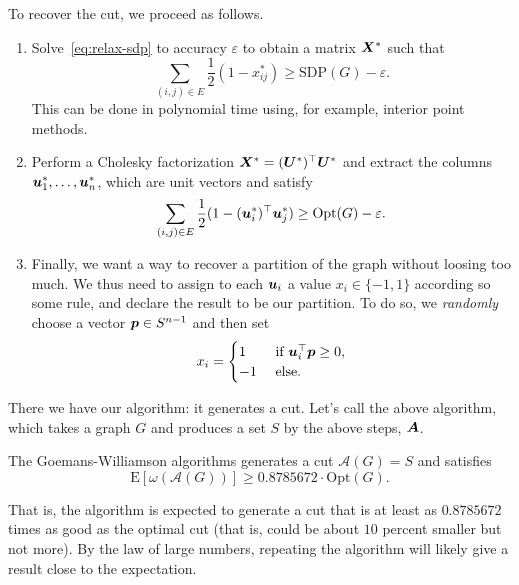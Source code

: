 To recover the cut, we proceed as follows.
\begin{enumerate}
 \item Solve~\eqref{eq:relax-sdp} to accuracy $\varepsilon$ to obtain a matrix $\bm{X}^*$ such that
 \begin{equation*}
  \sum_{(i,j)\in E} \frac{1}{2}(1-x_{ij}^*) \geq \mathrm{SDP}(G)-\varepsilon.
 \end{equation*}
 This can be done in polynomial time using, for example, interior point methods.
\item Perform a Cholesky factorization $\bm{X}^*=(\bm{U}^*)^{\top}\bm{U}^*$ and extract the columns
$\bm{u}_1^*,\dots,\bm{u}_n^*$, which are unit vectors and satisfy
\begin{equation*}
 \sum_{(i,j)\in E} \frac{1}{2}(1-(\bm{u}_i^*)^{\top}\bm{u}_j^*)\geq \mathrm{Opt}(G)-\varepsilon.
\end{equation*}
\item Finally, we want a way to recover a partition of the graph without loosing too much. We thus need to assign to each $\bm{u}_i$ a value $x_i\in \{-1,1\}$ according so some rule, and declare the result to be our partition. To do so, we {\em randomly} choose a vector $\bm{p}\in S^{n-1}$ and then set
\begin{equation*}
 x_i = \begin{cases}
        1 & \text{ if } \bm{u}_i^{\top}\bm{p} \geq 0,\\
        -1 & \text{ else.}
       \end{cases}
\end{equation*}
\end{enumerate}
There we have our algorithm: it generates a cut. Let's call the above algorithm, which takes a graph $G$ and produces a set $S$ by the above steps, $\bm{A}$.

\begin{theorem}
 The Goemans-Williamson algorithms generates a cut $\mathcal{A}(G)=S$ and satisfies
 \begin{equation*}
  \mathrm{E}[\omega(\mathcal{A}(G))] \geq 0.8785672 \cdot \mathrm{Opt}(G).
 \end{equation*}
\end{theorem}

That is, the algorithm is expected to generate a cut that is at least as $0.8785672$ times as good as the optimal cut (that is, could be about $10$ percent smaller but not more). By the law of large numbers, repeating the algorithm will likely give a result close to the expectation.




